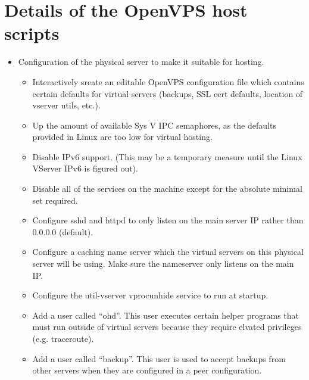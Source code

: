 \chapter{Details of the OpenVPS host scripts\label{app-openvps-host}}

\begin{itemize}

\item
  Configuration of the physical server to make it suitable for hosting.

  \begin{itemize}

  \item
    Interactively sreate an editable OpenVPS configuration file which
    contains certain defaults for virtual servers (backups, SSL cert
    defaults, location of vserver utils, etc.).
    
  \item
    Up the amount of available Sys V IPC semaphores, as the defaults
    provided in Linux are too low for virtual hosting.

  \item
    Disable IPv6 support. (This may be a temporary measure until the
    Linux VServer IPv6 is figured out).

  \item
    Disable all of the services on the machine except for the absolute
    minimal set required.

  \item
    Configure sshd and httpd to only listen on the main server IP rather
    than 0.0.0.0 (default).

  \item
    Configure a caching name server which the virtual servers on this
    physical server will be using. Make sure the nameserver only
    listens on the main IP.

  \item
    Configure the util-vserver vprocunhide service to run at startup.

  \item
    Add a user called ``ohd''. This user executes certain helper
    programs that must run outside of virtual servers because they
    require elvated privileges (e.g. traceroute).

  \item
    Add a user called ``backup''. This user is used to accept backups
    from other servers when they are configured in a peer
    configuration.


\end{itemize}
\end{itemize}
